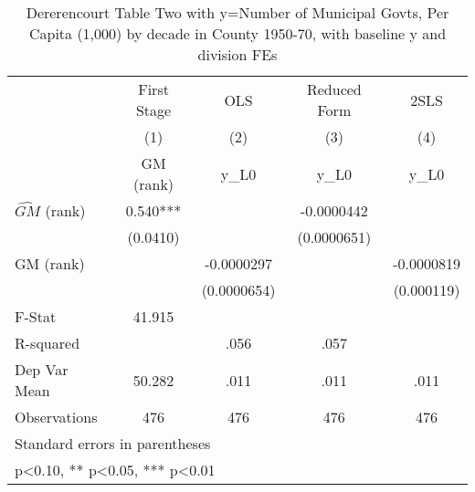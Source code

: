 \begin{table}[htbp]\centering
\def\sym#1{\ifmmode^{#1}\else\(^{#1}\)\fi}
\caption{Dererencourt Table Two with y=Number of Municipal Govts, Per Capita (1,000) by decade in County 1950-70, with baseline y and division FEs}
\begin{tabular}{l*{4}{c}}
\toprule
                    & First Stage   &         OLS   &Reduced Form   &        2SLS   \\
                    &\multicolumn{1}{c}{(1)}&\multicolumn{1}{c}{(2)}&\multicolumn{1}{c}{(3)}&\multicolumn{1}{c}{(4)}\\
                    &\multicolumn{1}{c}{GM  (rank)}&\multicolumn{1}{c}{y\_L0}&\multicolumn{1}{c}{y\_L0}&\multicolumn{1}{c}{y\_L0}\\
\midrule
$\hat{GM}$ (rank)   &       0.540***&               &  -0.0000442   &               \\
                    &    (0.0410)   &               & (0.0000651)   &               \\
\addlinespace
GM  (rank)          &               &  -0.0000297   &               &  -0.0000819   \\
                    &               & (0.0000654)   &               &  (0.000119)   \\
\midrule
F-Stat              &      41.915   &               &               &               \\
R-squared           &               &        .056   &        .057   &               \\
Dep Var Mean        &      50.282   &        .011   &        .011   &        .011   \\
Observations        &         476   &         476   &         476   &         476   \\
\bottomrule
\multicolumn{5}{l}{\footnotesize Standard errors in parentheses}\\
\multicolumn{5}{l}{\footnotesize * p<0.10, ** p<0.05, *** p<0.01}\\
\end{tabular}
\end{table}
